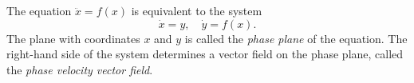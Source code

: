 The equation $\ddot{x} = f(x)$ is equivalent to the system
$$\dot{x} = y, \quad \dot{y} = f(x).$$
The plane with coordinates $x$ and $y$ is called the \textit{phase plane} of the equation.
The right-hand side of the system determines a vector field on the phase plane, called the \textit{phase velocity vector field}.
